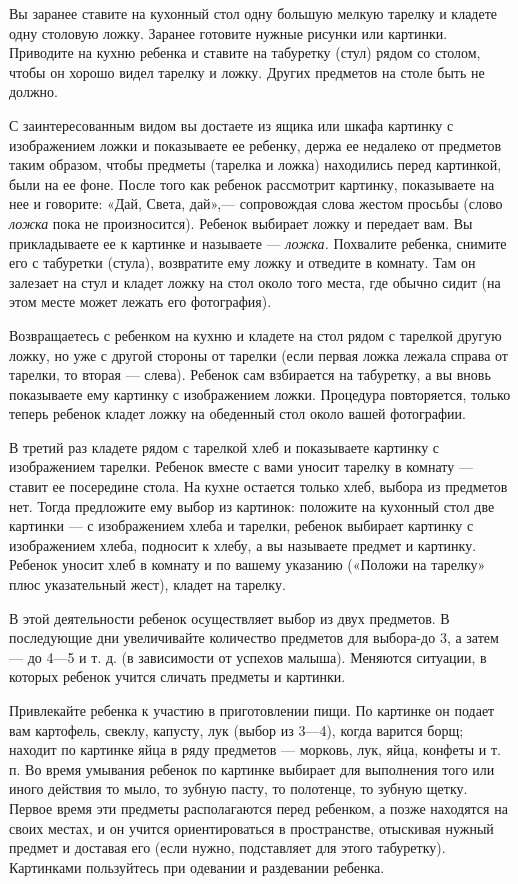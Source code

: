 \documentclass[a5paper]{book}
\renewcommand{\emph}[1]{\textit{#1}}
\begin{document}
Вы заранее ставите на кухонный стол одну большую мелкую тарелку и
кладете одну столовую ложку. Заранее готовите нужные рисунки или
картинки. Приводите на кухню ребенка и ставите на табуретку (стул) рядом
со столом, чтобы он хорошо видел тарелку и ложку. Других предметов на
столе быть не должно.

С заинтересованным видом вы достаете из ящика или шкафа картинку с
изображением ложки и показываете ее ребенку, держа ее недалеко от
предметов таким образом, чтобы предметы (тарелка и ложка) находились
перед картинкой, были на ее фоне. После того как ребенок рассмотрит
картинку, показываете на нее и говорите: «Дай, Света, дай»,---
сопровождая слова жестом просьбы (слово \emph{ложка} пока не
произносится). Ребенок выбирает ложку и передает вам. Вы прикладываете
ее к картинке и называете --- \emph{ложка.} Похвалите ребенка, снимите
его с табуретки (стула), возвратите ему ложку и отведите в комнату. Там
он залезает на стул и кладет ложку на стол около того места, где обычно
сидит (на этом месте может лежать его фотография).

Возвращаетесь с ребенком на кухню и кладете на стол рядом с тарелкой
другую ложку, но уже с другой стороны от тарелки (если первая ложка
лежала справа от тарелки, то вторая --- слева). Ребенок сам взбирается
на табуретку, а вы вновь показываете ему картинку с изображением ложки.
Процедура повторяется, только теперь ребенок кладет ложку на обеденный
стол около вашей фотографии.

В третий раз кладете рядом с тарелкой хлеб и показываете картинку с
изображением тарелки. Ребенок вместе с вами уносит тарелку в комнату ---
ставит ее посередине стола. На кухне остается только хлеб, выбора из
предметов нет. Тогда предложите ему выбор из картинок: положите на
кухонный стол две картинки --- с изображением хлеба и тарелки, ребенок
выбирает картинку с изображением хлеба, подносит к хлебу, а вы называете
предмет и картинку. Ребенок уносит хлеб в комнату и по вашему указанию
(«Положи на тарелку» плюс указательный жест), кладет на тарелку.

В этой деятельности ребенок осуществляет выбор из двух предметов. В
последующие дни увеличивайте количество предметов для выбора-до 3, а
затем --- до 4---5 и т. д. (в зависимости от успехов малыша). Меняются
ситуации, в которых ребенок учится сличать предметы и картинки.

Привлекайте ребенка к участию в приготовлении пищи. По картинке он
подает вам картофель, свеклу, капусту, лук (выбор из 3---4), когда
варится борщ; находит по картинке яйца в ряду предметов --- морковь,
лук, яйца, конфеты и т. п. Во время умывания ребенок по картинке
выбирает для выполнения того или иного действия то мыло, то зубную
пасту, то полотенце, то зубную щетку. Первое время эти предметы
располагаются перед ребенком, а позже находятся на своих местах, и он
учится ориентироваться в пространстве, отыскивая нужный предмет и
доставая его (если нужно, подставляет для этого табуретку). Картинками
пользуйтесь при одевании и раздевании ребенка.
\end{document}
